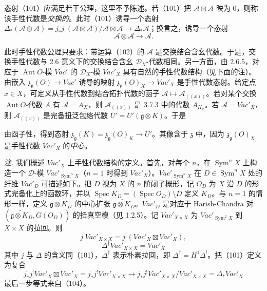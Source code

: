 态射（101）应满足若干公理，这里不予陈述。若（101）把 $\mathcal{A}\boxtimes\mathcal{A}$ 映为 0，则称该手性代数是\emph{交换的}。此时（101）诱导一个态射 $\Delta_*(\mathcal{A}\otimes\mathcal{A})=j_*j^{!}(\mathcal{A}\boxtimes\mathcal{A})/\mathcal{A}\boxtimes\mathcal{A}\to\Delta_*\mathcal{A}$；换言之，诱导一个态射
\begin{equation}\tag{102}
\mathcal{A}\otimes\mathcal{A}\to\mathcal{A}.
\end{equation}

此时手性代数公理只要求：带运算（102）的 $\mathcal{A}$ 是交换结合含幺代数。于是，交换手性代数与 2.6 意义下的交换结合含幺 $\mathcal{D}_X$-代数相同。另一方面，由 2.6.5，对应于 $\operatorname{Aut}O$-模 $\mathit{Vac}'$ 的 $\mathcal{D}_X$-模 $\mathit{Vac}'_X$ 具有自然的手性代数结构（见下面的注）。由嵌入 $\mathfrak{z}_{\mathfrak{g}}(O)\to\mathit{Vac}'$ 诱导的映射 $\mathfrak{z}_{\mathfrak{g}}(O)_X\to\mathit{Vac}'_X$ 是手性代数态射。给定点 $x\in X$，可定义从手性代数到结合拓扑代数的函子 $\mathcal{A}\mapsto\mathcal{A}_{((x))}$。若对某个交换 $\operatorname{Aut}O$-代数 $A$ 有 $\mathcal{A}=A_X$，则 $\mathcal{A}_{((x))}$ 是 3.7.3 中的代数 $A_{K_x}$。若 $\mathcal{A}=\mathit{Vac}'_X$，则 $\mathcal{A}_{((x))}$ 是完备扭泛包络代数 $\overline{U}'=\overline{U}'(\mathfrak{g}\otimes K)$。于是


由函子性，得到态射 $\mathfrak{z}_{\mathfrak{g}}(K)=\mathfrak{z}_{\mathfrak{g}}(O)_K\to\overline{U}'$。其像含于 $\mathfrak{z}$ 中，因为 $\mathfrak{z}_{\mathfrak{g}}(O)_X$ 是手性代数 $\mathit{Vac}'_X$ 的\emph{中心}。

\emph{注.} 我们概述 $\mathit{Vac}'_X$ 上手性代数结构的定义。首先，对每个 $n$，在 $\operatorname{Sym}^nX$ 上构造一个 $\mathcal{D}$-模 $\mathit{Vac}'_{\operatorname{Sym}^nX}$（$n=1$ 时得到 $\mathit{Vac}'_X$）。$\mathit{Vac}'_{\operatorname{Sym}^nX}$ 在 $D\in\operatorname{Sym}^nX$ 处的纤维 $\mathit{Vac}'_D$ 可描述如下。把 $D$ 视为 $X$ 的 $n$ 阶闭子概形，记 $O_D$ 为 $X$ 沿 $D$ 的形式完备化上的函数环，并以 $\operatorname{Spec}K_D=(\operatorname{Spec}O_D)\setminus D$ 定义 $K_D$。与 $n=1$ 的情形一样，定义 $\mathfrak{g}\otimes K_D$ 的中心扩张 $\widetilde{\mathfrak{g}\otimes K_D}$。$\mathit{Vac}'_D$ 是对应于 Harish-Chandra 对 $(\widetilde{\mathfrak{g}\otimes K_D},G(O_D))$ 的扭真空模（见 1.2.5）。记 $\mathit{Vac}'_{X\times X}$ 为 $\mathit{Vac}'_{\operatorname{Sym}^2X}$ 到 $X\times X$ 的拉回。则
\begin{equation}\tag{103}
j^{!}\mathit{Vac}'_{X\times X}=j^{!}(\mathit{Vac}'_X\boxtimes\mathit{Vac}'_X),
\end{equation}
\begin{equation}\tag{104}
\Delta^{\dagger}\mathit{Vac}'_{X\times X}=\mathit{Vac}'_X
\end{equation}
其中 $j$ 与 $\Delta$ 的含义同（101），$\Delta^{\dagger}$ 表示朴素拉回，即 $\Delta^{\dagger}=H^1\Delta^{!}$。把（101）定义为复合
\[
j_*j^{!}\mathit{Vac}'_X\boxtimes\mathit{Vac}'_X=j_*j^{!}\mathit{Vac}'_{X\times X}\to j_*j^{!}\mathit{Vac}'_{X\times X}/\mathit{Vac}'_{X\times X}=\Delta_*\mathit{Vac}'_X
\]
最后一步等式来自（104）。

